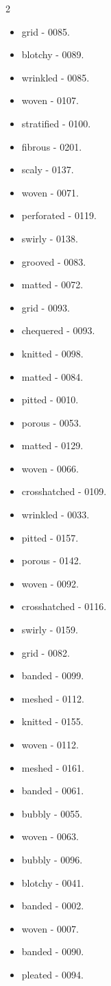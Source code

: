 \begin{multicols}{2}
\begin{itemize}
\item grid - 0085.
\item blotchy - 0089.
\item wrinkled - 0085.
\item woven - 0107.
\item stratified - 0100.
\item fibrous - 0201.
\item scaly - 0137.
\item woven - 0071.
\item perforated - 0119.
\item swirly - 0138.
\item grooved - 0083.
\item matted - 0072.
\item grid - 0093.
\item chequered - 0093.
\item knitted - 0098.
\item matted - 0084.
\item pitted - 0010.
\item porous - 0053.
\item matted - 0129.
\item woven - 0066.
\item crosshatched - 0109.
\item wrinkled - 0033.
\item pitted - 0157.
\item porous - 0142.
\item woven - 0092.
\item crosshatched - 0116.
\item swirly - 0159.
\item grid - 0082.
\item banded - 0099.
\item meshed - 0112.
\item knitted - 0155.
\item woven - 0112.
\item meshed - 0161.
\item banded - 0061.
\item bubbly - 0055.
\item woven - 0063.
\item bubbly - 0096.
\item blotchy - 0041.
\item banded - 0002.
\item woven - 0007.
\item banded - 0090.
\item pleated - 0094.
\end{itemize}
\end{multicols}